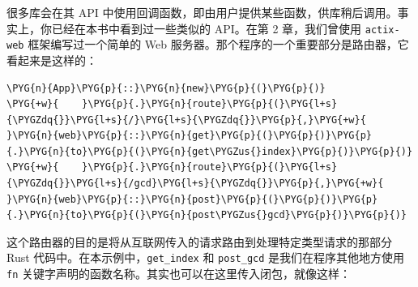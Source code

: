 很多库会在其 API 中使用回调函数，即由用户提供某些函数，供库稍后调用。事实上，你已经在本书中看到过一些类似的 API。在第 2 章，我们曾使用 \texttt{actix-web} 框架编写过一个简单的 Web 服务器。那个程序的一个重要部分是路由器，它看起来是这样的：

\begin{Verbatim}[commandchars=\\\{\},breaklines=true,breakanywhere=true,fontsize=\codefont,xleftmargin=17bp]
\PYG{n}{App}\PYG{p}{::}\PYG{n}{new}\PYG{p}{(}\PYG{p}{)}
\PYG{+w}{    }\PYG{p}{.}\PYG{n}{route}\PYG{p}{(}\PYG{l+s}{\PYGZdq{}}\PYG{l+s}{/}\PYG{l+s}{\PYGZdq{}}\PYG{p}{,}\PYG{+w}{ }\PYG{n}{web}\PYG{p}{::}\PYG{n}{get}\PYG{p}{(}\PYG{p}{)}\PYG{p}{.}\PYG{n}{to}\PYG{p}{(}\PYG{n}{get\PYGZus{}index}\PYG{p}{)}\PYG{p}{)}
\PYG{+w}{    }\PYG{p}{.}\PYG{n}{route}\PYG{p}{(}\PYG{l+s}{\PYGZdq{}}\PYG{l+s}{/gcd}\PYG{l+s}{\PYGZdq{}}\PYG{p}{,}\PYG{+w}{ }\PYG{n}{web}\PYG{p}{::}\PYG{n}{post}\PYG{p}{(}\PYG{p}{)}\PYG{p}{.}\PYG{n}{to}\PYG{p}{(}\PYG{n}{post\PYGZus{}gcd}\PYG{p}{)}\PYG{p}{)}
\end{Verbatim}

这个路由器的目的是将从互联网传入的请求路由到处理特定类型请求的那部分 Rust 代码中。在本示例中，\texttt{get\_index} 和 \texttt{post\_gcd} 是我们在程序其他地方使用 \texttt{fn} 关键字声明的函数名称。其实也可以在这里传入闭包，就像这样：

